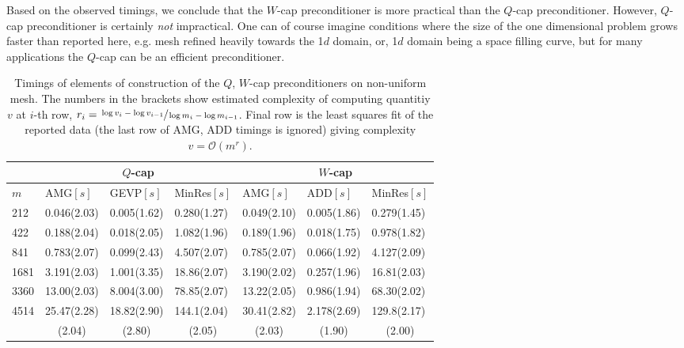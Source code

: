 \documentclass[10pt, a4paper]{article}
\begin{document}
Based on the observed timings, we conclude that the $W$-cap preconditioner is more
practical than the $Q$-cap preconditioner. However, $Q$-cap preconditioner is
certainly \textit{not} impractical. One can of course imagine conditions where
the size of the one dimensional problem grows faster than reported here, e.g.
mesh refined heavily towards the 1$d$ domain, or, 1$d$ domain being a space
filling curve, but for many applications the $Q$-cap can be an efficient 
preconditioner.
%
\begin{table}[ht]
  \caption{Timings of elements of construction of the $Q$, $W$-cap
  preconditioners on non-uniform mesh. The numbers in the brackets show 
  estimated complexity of computing quantitiy $v$ at $i$-th row,
  $r_i=\sfrac{\log{v_i}-\log{v_{i-1}}}{\log{m_i}-\log{m_{i-1}}}$. Final row is
  the least squares fit of the reported data (the last row of AMG, ADD
  timings is ignored) giving complexity $v=\mathcal{O}(m^r)$.}
\label{tab:timings_nonunif}
\footnotesize{
\begin{tabular}{l|lll|lll}
\hline
 & \multicolumn{3}{c|}{$Q$-cap} & \multicolumn{3}{c}{$W$-cap}\\
\hline
$m$ & AMG$\left[s\right]$ & GEVP$\left[s\right]$ & MinRes$\left[s\right]$ &
      AMG$\left[s\right]$ & ADD$\left[s\right]$  & MinRes$\left[s\right]$ \\
\hline
212  & 0.046(2.03)  & 0.005(1.62)  & 0.280(1.27)   & 0.049(2.10)  & 0.005(1.86) & 0.279(1.45)   \\
422  & 0.188(2.04)  & 0.018(2.05)  & 1.082(1.96)   & 0.189(1.96)  & 0.018(1.75) & 0.978(1.82)   \\
841  & 0.783(2.07)  & 0.099(2.43)  & 4.507(2.07)   & 0.785(2.07)  & 0.066(1.92) & 4.127(2.09)   \\
1681 & 3.191(2.03)  & 1.001(3.35)  & 18.86(2.07)   & 3.190(2.02)  & 0.257(1.96) & 16.81(2.03)  \\
3360 & 13.00(2.03)  & 8.004(3.00)  & 78.85(2.07)   & 13.22(2.05)  & 0.986(1.94) & 68.30(2.02)  \\
4514 & 25.47(2.28)  & 18.82(2.90)  & 144.1(2.04)   & 30.41(2.82)  & 2.178(2.69) & 129.8(2.17) \\
\hline
  &  \multicolumn{1}{c}{(2.04)} & \multicolumn{1}{c}{(2.80)} & \multicolumn{1}{c|}{(2.05)} &
     \multicolumn{1}{c}{(2.03)} & \multicolumn{1}{c}{(1.90)} & \multicolumn{1}{c}{(2.00)}  \\
\hline
\end{tabular}
}
\end{table}
\end{document}
